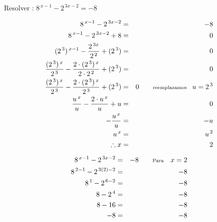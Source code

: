\documentclass[11pt, twocolumn, landscape, a4paper]{scrbook}
\begin{document}
Resolver : \qquad$8^{\,x - 1} - 2^{\,3x - 2} = -8$ 

\begin{eqnarray*}
8^{\,x - 1} - 2^{\,3x - 2} &=& -8 \\
8^{\,x - 1} - 2^{\,3x - 2} + 8 &=& 0 \\
(2^{\,3})^{\,x - 1} - \dfrac{2^{\,3x}}{2^{\,2}} + (2^{\,3}) &=& 0 \\
\dfrac{(2^{\,3})^{\,x}}{2^{\,3}} - \dfrac{2 \cdot (2^{\,3})^ {\,x}}{2 \cdot 2^{\,2}} + (2^{\,3}) &=& 0 \\
\dfrac{(2^{\,3})^{\,x}}{2^{\,3}} - \dfrac{2 \cdot (2^{\,3})^ {\,x}}{2^{\,3}} + (2^{\,3}) &=& 0 \qquad \scriptsize{\text{reemplazamos}} \quad u = 2^{\,3} \\
\dfrac{u^{\,x}}{u} - \dfrac{2 \cdot u^ {\,x}}{u} + u &=& 0 \\
- \dfrac{u^ {\,x}}{u} &=& - u \\
u^ {\,x} &=& u^{\,2} \\
\therefore x &=& 2 \\
\end{eqnarray*}

\begin{eqnarray*}
8^{\,x - 1} - 2^{\,3x - 2} &=& -8 \qquad \text{\scriptsize Para}\quad x = 2 \\
8^{\,2 - 1} - 2^{\,3(2) - 2} &=& -8 \\
8^{\,1} - 2^{\,6 - 2} &=& -8 \\
8 - 2^{\,4} &=& -8 \\
8 - 16 &=& -8 \\
- 8 &=& -8
\end{eqnarray*}
\end{document}

